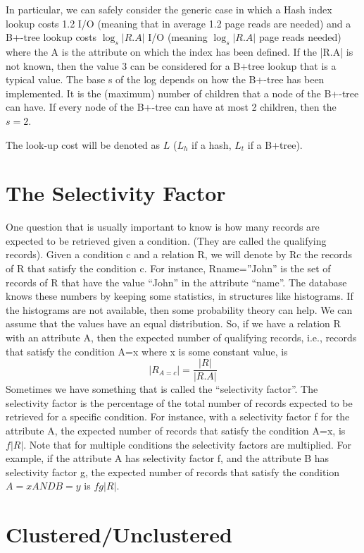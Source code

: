 \documentclass[12pt]{article}
\begin{document}
In particular, we can safely consider the generic case in which a Hash index lookup costs 1.2 I/O (meaning that in average 1.2 page reads are needed) and a B+-tree lookup costs  $\log_s | R.A |$ I/O (meaning $\log_s | R.A |$ page reads needed) where the A is the attribute on which the index has been defined. If the |R.A| is not known, then the value 3 can be considered for a B+tree lookup that is a typical value. The base s of the log depends on how the B+-tree has been implemented. It is the (maximum) number of children that a node of the B+-tree can have. If every node of the B+-tree can have at most 2 children, then the $s=2$.

The look-up cost will be denoted as $L$ ($L_h$ if a hash, $L_t$ if a B+tree).

\section{The Selectivity Factor}

One question that is usually important to know is how many records are expected to be retrieved given a condition. (They are called the qualifying records). Given a condition c and a relation R, we will denote by Rc the records of R that satisfy the condition c. For instance, Rname=”John” is the set of records of R that have the value “John” in the attribute “name”. The database knows these numbers by keeping some statistics, in structures like histograms. If the histograms are not available, then some probability theory can help. We can assume that the values have an equal distribution. So, if we have a relation R with an attribute A, then the expected number of qualifying records, i.e., records that satisfy the condition A=x where x is some constant value, is
$$
|R_{A = c}| = \frac { |R| }{ |R.A| }
$$
Sometimes we have something that is called the “selectivity factor”. The selectivity factor is the percentage of the total number of records expected to be retrieved for a specific condition. For instance, with a selectivity factor f for the attribute A, the expected number of records that satisfy the condition A=x, is $f|R|$.
Note that for multiple conditions the selectivity factors are multiplied. For example, if the attribute A has selectivity factor f, and the attribute B has selectivity factor g, the expected number of records that satisfy the condition $A=x AND B=y$ is $fg|R|$.

\section{Clustered/Unclustered}
\end{document}
